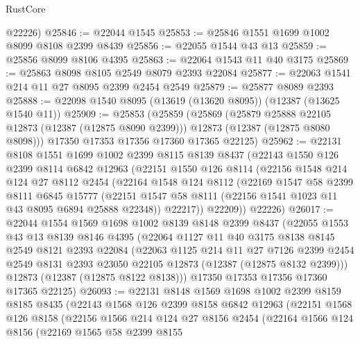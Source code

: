 \begin{lexlean}{RustCore}
\begin{coremodule}
      @22226)
@25846 := @22044 @1545
@25853 := @25846 @1551 @1699 @1002 @8099 @8108 @2399 @8439
@25856 := @22055 @1544 @43 @13
@25859 := @25856 @8099 @8106 @4395
@25863 := @22064 @1543 @11 @40 @3175
@25869 := @25863 @8098 @8105 @2549 @8079 @2393 @22084
@25877 := @22063 @1541 @214 @11 @27 @8095 @2399 @2454 @2549
@25879 := @25877 @8089 @2393
@25888 := @22098 @1540 @8095 (@13619 (@13620 @8095)) (@12387 (@13625 @1540 @11))
@25909 := @25853
    (@25859
      (@25869
        (@25879 @25888 @22105 @12873 (@12387 (@12875 @8090 @2399)))
        @12873
        (@12387 (@12875 @8080 @8098)))
      @17350
      @17353
      @17356
      @17360
      @17365
      @22125)
@25962 := @22131
    @8108
    @1551
    @1699
    @1002
    @2399
    @8115
    @8139
    @8437
    (@22143
      @1550
      @126
      @2399
      @8114
      @6842
      @12963
      (@22151
        @1550
        @126
        @8114
        (@22156
          @1548
          @214
          @124
          @27
          @8112
          @2454
          (@22164
            @1548
            @124
            @8112
            (@22169
              @1547
              @58
              @2399
              @8111
              @6845
              @15777
              (@22151 @1547 @58 @8111 (@22156 @1541 @1023 @11 @43 @8095 @6894 @25888 @22348))
              @22217))
          @22209))
      @22226)
@26017 := @22044
    @1554
    @1569
    @1698
    @1002
    @8139
    @8148
    @2399
    @8437
    (@22055
      @1553
      @43
      @13
      @8139
      @8146
      @4395
      (@22064
        @1127
        @11
        @40
        @3175
        @8138
        @8145
        @2549
        @8121
        @2393
        @22084
        (@22063
          @1125
          @214
          @11
          @27
          @7126
          @2399
          @2454
          @2549
          @8131
          @2393
          @23050
          @22105
          @12873
          (@12387 (@12875 @8132 @2399)))
        @12873
        (@12387 (@12875 @8122 @8138)))
      @17350
      @17353
      @17356
      @17360
      @17365
      @22125)
@26093 := @22131
    @8148
    @1569
    @1698
    @1002
    @2399
    @8159
    @8185
    @8435
    (@22143
      @1568
      @126
      @2399
      @8158
      @6842
      @12963
      (@22151
        @1568
        @126
        @8158
        (@22156
          @1566
          @214
          @124
          @27
          @8156
          @2454
          (@22164
            @1566
            @124
            @8156
            (@22169
              @1565
              @58
              @2399
              @8155

\end{coremodule}
\end{lexlean}
